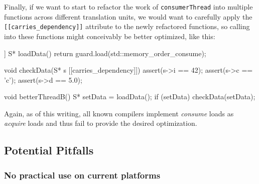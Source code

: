 \noindent Finally, if we want to start to refactor the work of
\lstinline!consumerThread! into multiple\linebreak%
 functions across different
translation units, we would want to carefully apply the\linebreak%
\lstinline![[carries_dependency]]! attribute to the newly refactored
functions, so calling into these functions might conceivably be better
optimized, like this:

\begin{emcppslisting}[language=C++]
[[carries_dependency]] S* loadData()
{
    return guard.load(std::memory_order_consume);
}

void checkData(S* s [[carries_dependency]])
{
    assert(s->i == 42);
    assert(s->c == 'c');
    assert(s->d == 5.0);
}

void betterThreadB()
{
    S* setData = loadData();
    if (setData)
    {
        checkData(setData);
    }
}
\end{emcppslisting}
    
\noindent Again, as of this writing, all known compilers implement \emph{consume}
loads as \emph{acquire} loads and thus fail to provide the desired
optimization.

\subsection[Potential Pitfalls]{Potential Pitfalls}\label{potential-pitfalls}

\subsubsection[No practical use on current platforms]{No practical use on current platforms}\label{no-practical-use-on-current-platforms}

